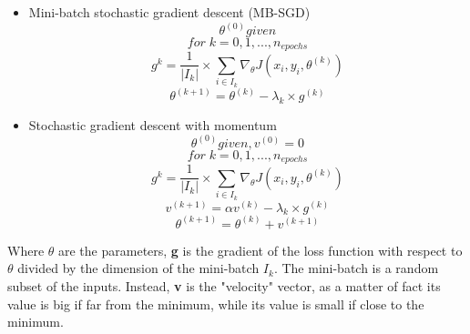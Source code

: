 \documentclass{article}
\begin{document}
\begin{itemize}
    \item Mini-batch stochastic gradient descent (MB-SGD)
    \begin{equation}\nonumber
        \theta^{(0)} given
    \end{equation}
    \begin{equation}\nonumber
        for \; k = 0,1,...,n_{epochs}
    \end{equation}
    \begin{equation}\nonumber
        g^{k} = \frac{1}{|I_k|} \times \sum_{i \in I_k} \nabla_{\theta} J(x_i , y_i , \theta^{(k)})
    \end{equation}
    \begin{equation}\nonumber
        \theta^{(k+1)} = \theta^{(k)} - \lambda_k \times g^{(k)}
    \end{equation}
    
    \item Stochastic gradient descent with momentum
    \begin{equation}\nonumber
        \theta^{(0)} given , v^{(0)} = 0
    \end{equation}
    \begin{equation}\nonumber
        for \; k = 0,1,...,n_{epochs}
    \end{equation}
    \begin{equation}\nonumber
        g^{k} = \frac{1}{|I_k|} \times \sum_{i \in I_k} \nabla_{\theta} J(x_i , y_i , \theta^{(k)})
    \end{equation}
    \begin{equation}\nonumber
        v^{(k+1)} = \alpha v^{(k)} - \lambda_k \times g^{(k)}
    \end{equation}
    \begin{equation}\nonumber
        \theta^{(k+1)} = \theta^{(k)} +  v^{(k+1)}
    \end{equation}
\end{itemize}

Where ${\theta}$ are the parameters, \textbf{g} is the gradient of the loss function with respect to ${\theta}$ divided by the dimension of the mini-batch \textbf{$I_{k}$}. \newline The mini-batch is a random subset of the inputs. Instead, \textbf{v} is the "velocity" vector, as a matter of fact its value is big if far from the minimum, while its value is small if close to the minimum.
\end{document}
